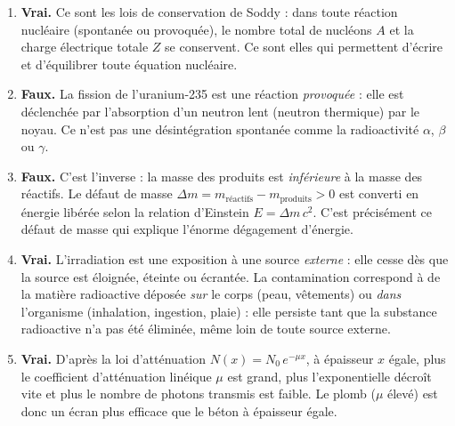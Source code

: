\documentclass[11pt]{article}
\begin{document}
\begin{corrige}
\begin{enumerate}
\item \textbf{Vrai.} Ce sont les lois de conservation de Soddy : dans toute réaction nucléaire (spontanée ou provoquée), le nombre total de nucléons $A$ et la charge électrique totale $Z$ se conservent. Ce sont elles qui permettent d'écrire et d'équilibrer toute équation nucléaire.
\item \textbf{Faux.} La fission de l'uranium-235 est une réaction \emph{provoquée} : elle est déclenchée par l'absorption d'un neutron lent (neutron thermique) par le noyau. Ce n'est pas une désintégration spontanée comme la radioactivité $\alpha$, $\beta$ ou $\gamma$.
\item \textbf{Faux.} C'est l'inverse : la masse des produits est \emph{inférieure} à la masse des réactifs. Le défaut de masse $\Delta m = m_{\text{réactifs}} - m_{\text{produits}} > 0$ est converti en énergie libérée selon la relation d'Einstein $E = \Delta m\,c^2$. C'est précisément ce défaut de masse qui explique l'énorme dégagement d'énergie.
\item \textbf{Vrai.} L'irradiation est une exposition à une source \emph{externe} : elle cesse dès que la source est éloignée, éteinte ou écran­tée. La contamination correspond à de la matière radioactive déposée \emph{sur} le corps (peau, vêtements) ou \emph{dans} l'organisme (inhalation, ingestion, plaie) : elle persiste tant que la substance radioactive n'a pas été éliminée, même loin de toute source externe.
\item \textbf{Vrai.} D'après la loi d'atténuation $N(x) = N_0\,e^{-\mu x}$, à épaisseur $x$ égale, plus le coefficient d'atténuation linéique $\mu$ est grand, plus l'exponentielle décroît vite et plus le nombre de photons transmis est faible. Le plomb ($\mu$ élevé) est donc un écran plus efficace que le béton à épaisseur égale.
\end{enumerate}
\end{corrige}
\end{document}
